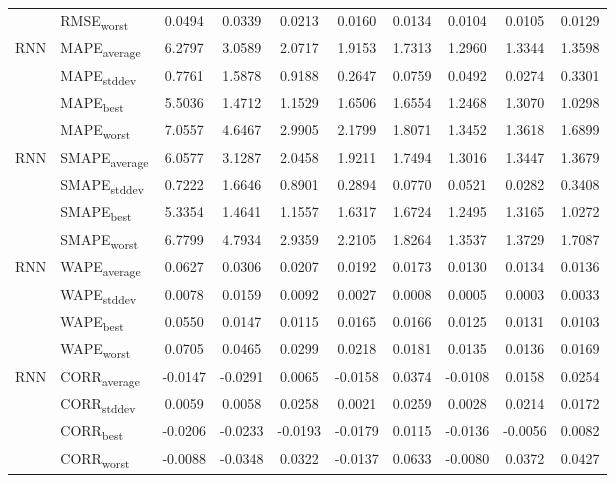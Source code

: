 {\begin{longtable}{l l c c c c c c c c}
 & RMSE\textsubscript{worst} & 0.0494 & 0.0339 & 0.0213 & 0.0160 & 0.0134 & 0.0104 & 0.0105 & 0.0129 \\
\cmidrule(lr){2-10}
\multirow{4}{*}{RNN} & MAPE\textsubscript{average} & 6.2797 & 3.0589 & 2.0717 & 1.9153 & 1.7313 & 1.2960 & 1.3344 & 1.3598 \\
 & MAPE\textsubscript{stddev} & 0.7761 & 1.5878 & 0.9188 & 0.2647 & 0.0759 & 0.0492 & 0.0274 & 0.3301 \\
 & MAPE\textsubscript{best} & 5.5036 & 1.4712 & 1.1529 & 1.6506 & 1.6554 & 1.2468 & 1.3070 & 1.0298 \\
 & MAPE\textsubscript{worst} & 7.0557 & 4.6467 & 2.9905 & 2.1799 & 1.8071 & 1.3452 & 1.3618 & 1.6899 \\
\cmidrule(lr){2-10}
\multirow{4}{*}{RNN} & SMAPE\textsubscript{average} & 6.0577 & 3.1287 & 2.0458 & 1.9211 & 1.7494 & 1.3016 & 1.3447 & 1.3679 \\
 & SMAPE\textsubscript{stddev} & 0.7222 & 1.6646 & 0.8901 & 0.2894 & 0.0770 & 0.0521 & 0.0282 & 0.3408 \\
 & SMAPE\textsubscript{best} & 5.3354 & 1.4641 & 1.1557 & 1.6317 & 1.6724 & 1.2495 & 1.3165 & 1.0272 \\
 & SMAPE\textsubscript{worst} & 6.7799 & 4.7934 & 2.9359 & 2.2105 & 1.8264 & 1.3537 & 1.3729 & 1.7087 \\
\cmidrule(lr){2-10}
\multirow{4}{*}{RNN} & WAPE\textsubscript{average} & 0.0627 & 0.0306 & 0.0207 & 0.0192 & 0.0173 & 0.0130 & 0.0134 & 0.0136 \\
 & WAPE\textsubscript{stddev} & 0.0078 & 0.0159 & 0.0092 & 0.0027 & 0.0008 & 0.0005 & 0.0003 & 0.0033 \\
 & WAPE\textsubscript{best} & 0.0550 & 0.0147 & 0.0115 & 0.0165 & 0.0166 & 0.0125 & 0.0131 & 0.0103 \\
 & WAPE\textsubscript{worst} & 0.0705 & 0.0465 & 0.0299 & 0.0218 & 0.0181 & 0.0135 & 0.0136 & 0.0169 \\
\cmidrule(lr){2-10}
\multirow{4}{*}{RNN} & CORR\textsubscript{average} & -0.0147 & -0.0291 & 0.0065 & -0.0158 & 0.0374 & -0.0108 & 0.0158 & 0.0254 \\
 & CORR\textsubscript{stddev} & 0.0059 & 0.0058 & 0.0258 & 0.0021 & 0.0259 & 0.0028 & 0.0214 & 0.0172 \\
 & CORR\textsubscript{best} & -0.0206 & -0.0233 & -0.0193 & -0.0179 & 0.0115 & -0.0136 & -0.0056 & 0.0082 \\
 & CORR\textsubscript{worst} & -0.0088 & -0.0348 & 0.0322 & -0.0137 & 0.0633 & -0.0080 & 0.0372 & 0.0427 \\

\end{longtable}}
